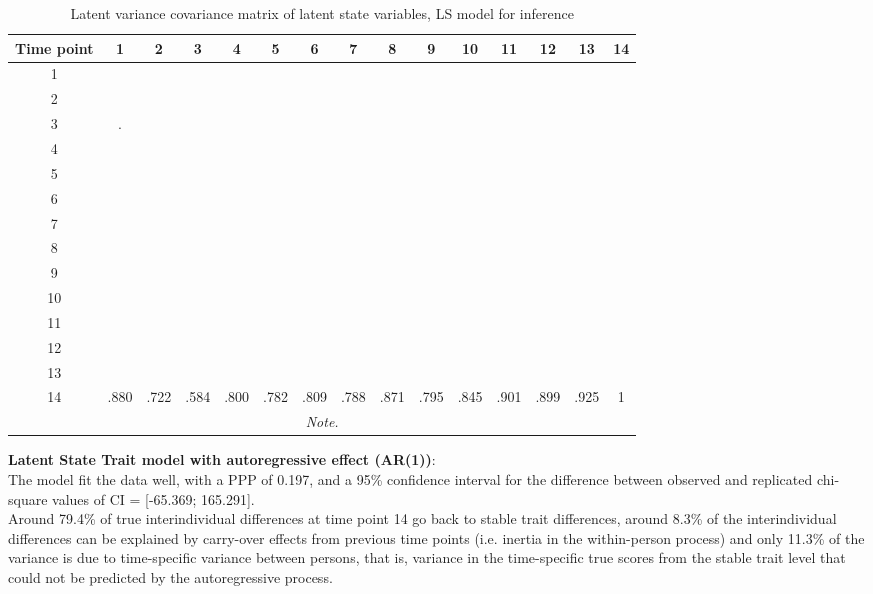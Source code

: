 \begin{table}[H]
 \setlength{\tabcolsep}{1mm}
 \begin{center}
        \caption[Correlation latent State inference]{Latent variance covariance matrix of latent state variables, LS model for inference}
        \label{Tab: correlations LS inference}
            {\footnotesize
            \begin{tabular}{ccccccccccccccc}
            \hline 
           Time point  & 1 &2&3&4&5&6&7&8&9&10&11&12&13&14 \\
           \hline
           1 & &&&&&&&&&&&&& \\
           2 & &&&&&&&&&&&&& \\
           3 & .&&&&&&&&&&&&& \\
           4 &&&&&&&&&&&&&& \\
           5 & &&&&&&&&&&&&& \\
           6 &&&&&&&&&&&&&& \\
           7 & &&&&&&&&&&&&& \\
            8 & &&&&&&&&&&&&& \\
            9 & &&&&&&&&&&&&& \\
           10 & &&&&&&&&&&&&& \\
           11 &&&&&&&&&&&&&& \\
           12 &&&&&&&&&&&&&& \\
            13 & &&&&&&&&&&&&& \\
            14 & .880&.722&.584&.800&.782&.809&.788&.871&.795&.845&.901&.899&.925&1 \\
 \hline 
\multicolumn{15}{p{0.65\textwidth}}{\scriptsize{\textit{Note.}}} \\
            \end{tabular}}
        \end{center}
        \end{table}


\textbf{Latent State Trait model with autoregressive effect (AR(1))}: \\
The model fit the data well, with a PPP of 0.197, and a 95\% confidence interval for the difference between observed and replicated chi-square values of CI =  [-65.369; 165.291]. \\
Around 79.4\% of true interindividual differences at time point 14 go back to stable trait differences, around 8.3\% of the interindividual differences can be explained by carry-over effects from previous time points (i.e. inertia in the within-person process) and only 11.3\% of the variance is due to time-specific variance between persons, that is, variance in the time-specific true scores from the stable trait level that could not be predicted by the autoregressive process.

